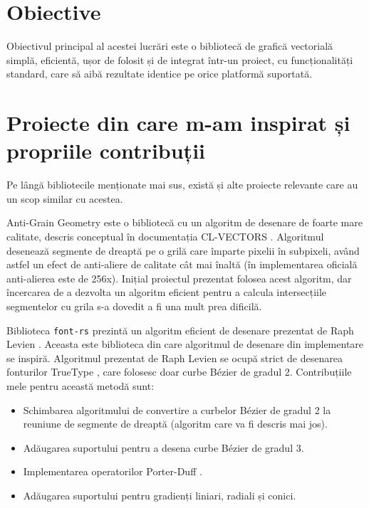 \documentclass[a4paper, 12pt]{report}
\begin{document}
\section{Obiective}

Obiectivul principal al acestei lucrări este o bibliotecă de grafică vectorială simplă, eficientă, ușor de folosit
și de integrat într-un proiect, cu funcționalități standard, care să aibă rezultate identice
pe orice platformă suportată.

\section{Proiecte din care m-am inspirat și propriile contribuții}

Pe lângă bibliotecile menționate mai sus, există și alte proiecte relevante care au un scop similar
cu acestea.

Anti-Grain Geometry \cite{antigrain_library} este o bibliotecă cu un algoritm de desenare de foarte mare calitate, descris
conceptual în documentația CL-VECTORS \cite{cl-aa_algorithm}. Algoritmul desenează segmente de dreaptă pe o grilă care împarte pixelii
în subpixeli, având astfel un efect de anti-aliere de calitate cât mai înaltă (în implementarea oficială anti-alierea este
de 256x). Inițial proiectul prezentat folosea acest algoritm, dar încercarea de a dezvolta
un algoritm eficient pentru a calcula intersecțiile segmentelor cu grila s-a dovedit a fi una mult prea dificilă.

Biblioteca \texttt{font-rs} \cite{font-rs_library} prezintă un algoritm eficient de desenare prezentat de Raph Levien
\cite{fastest_font_renderer_in_the_world}. Aceasta este biblioteca din care algoritmul de desenare din implementare se inspiră.
Algoritmul prezentat de Raph Levien se ocupă strict de desenarea fonturilor TrueType \cite{TrueType}, care
folosesc doar curbe Bézier \cite{bezier_curve} de gradul 2. Contribuțiile mele pentru această metodă sunt:

\begin{itemize}
    \item{Schimbarea algoritmului de convertire a curbelor Bézier de gradul 2 la reuniune de segmente de dreaptă (algoritm care va fi descris mai jos).}
    \item{Adăugarea suportului pentru a desena curbe Bézier de gradul 3.}
    \item{Implementarea operatorilor Porter-Duff \cite{Porter-Duff}.}
    \item{Adăugarea suportului pentru gradienți liniari, radiali și conici.}
\end{itemize}
\end{document}
